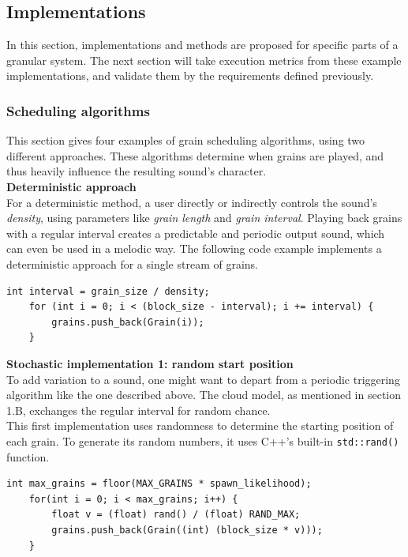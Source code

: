 \documentclass[10pt, twocolumn]{IEEEtran}
\begin{document}
\subsection{Implementations}
In this section, implementations and methods are proposed for specific parts of a granular system. The next section will take execution metrics from these example implementations, and validate them by the requirements defined previously.\\

\subsubsection{Scheduling algorithms}
This section gives four examples of grain scheduling algorithms, using two different approaches. These algorithms determine when grains are played, and thus heavily influence the resulting sound's character.\\

\textbf{Deterministic approach}\\
For a deterministic method, a user directly or indirectly controls the sound's \textit{density}, using parameters like \textit{grain length} and \textit{grain interval}. Playing back grains with a regular interval creates a predictable and periodic output sound, which can even be used in a melodic way. The following code example implements a deterministic approach for a single stream of grains.\\
\begin{minipage}{\linewidth}
\begin{lstlisting}[caption={A deterministic method of grain "seeding"}]
	int interval = grain_size / density;
	for (int i = 0; i < (block_size - interval); i += interval) {
		grains.push_back(Grain(i));
	}
\end{lstlisting}
\end{minipage}

\textbf{Stochastic implementation 1: random start position}\\
To add variation to a sound, one might want to depart from a periodic triggering algorithm like the one described above. The cloud model, as mentioned in section 1.B, exchanges the regular interval for random chance. \\
This first implementation uses randomness to determine the starting position of each grain. To generate its random numbers, it uses C++'s built-in \lstinline|std::rand()| function.
\begin{minipage}{\linewidth}
\begin{lstlisting}[caption={A stochastic method of grain seeding: random start position}]
	int max_grains = floor(MAX_GRAINS * spawn_likelihood);
	for(int i = 0; i < max_grains; i++) {
		float v = (float) rand() / (float) RAND_MAX;
		grains.push_back(Grain((int) (block_size * v)));
	}
\end{lstlisting}
\end{minipage}
\end{document}
